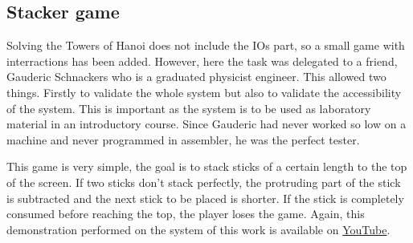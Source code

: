 \subsection{Stacker game}

Solving the Towers of Hanoi does not include the IOs part, so a small game with interractions has 
been added. However, here the task was delegated to a friend, 
Gauderic Schnackers who is a graduated physicist engineer. This allowed two things. Firstly to 
validate the whole system but also to validate the accessibility of the system. This is important 
as the system is to be used as laboratory material in an introductory course. Since Gauderic had 
never worked so low on a machine and never programmed in assembler, he was the perfect tester. 

This game is very simple, the goal is to stack sticks of a certain length to the top of the screen. 
If two sticks don't stack perfectly, the protruding part of the stick is subtracted and the next 
stick to be placed is shorter. If the stick is completely consumed before reaching the top, the 
player loses the game. Again, this demonstration performed on the system of this work is available 
on \href{https://www.youtube.com/watch?v=yHJDM_ckR1g}{YouTube}.